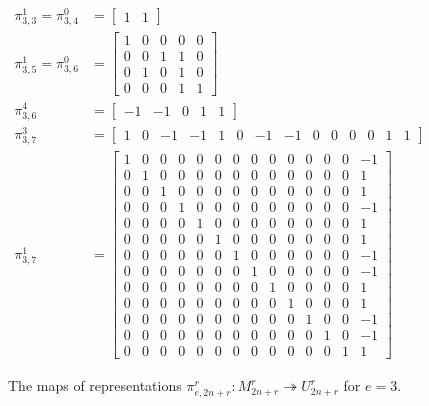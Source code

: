 \documentclass{amsart}
\begin{document}
\begin{figure}
\begin{align*} 
  \pi_{3,3}^1 = \pi_{3,4}^0 &=  
\begin{bmatrix}
  1 & 1
\end{bmatrix}\\
\pi_{3,5}^1 = \pi_{3,6}^0&=  
\begin{bmatrix}
  1 & 0 & 0 & 0 & 0\\
  0 & 0 & 1 & 1 & 0\\
  0 & 1 & 0 & 1 & 0\\
  0 & 0 & 0 & 1 & 1
\end{bmatrix}\\
\pi_{3,6}^4&=  
\begin{bmatrix}
  -1 & -1 & 0 & 1 & 1
\end{bmatrix}\\
\pi_{3,7}^3&=  
\begin{bmatrix}
 1 & 0 &-1 &-1 & 1 & 0 & -1 & -1 & 0 & 0 & 0 & 0 & 1 & 1
\end{bmatrix}\\
\pi_{3,7}^1&=  
\begin{bmatrix}
 1 & 0 & 0 & 0 & 0 & 0 & 0 & 0 & 0 & 0 & 0 & 0 & 0 &-1\\
 0 & 1 & 0 & 0 & 0 & 0 & 0 & 0 & 0 & 0 & 0 & 0 & 0 & 1\\
 0 & 0 & 1 & 0 & 0 & 0 & 0 & 0 & 0 & 0 & 0 & 0 & 0 & 1\\
 0 & 0 & 0 & 1 & 0 & 0 & 0 & 0 & 0 & 0 & 0 & 0 & 0 &-1\\
 0 & 0 & 0 & 0 & 1 & 0 & 0 & 0 & 0 & 0 & 0 & 0 & 0 & 1\\
 0 & 0 & 0 & 0 & 0 & 1 & 0 & 0 & 0 & 0 & 0 & 0 & 0 & 1\\
 0 & 0 & 0 & 0 & 0 & 0 & 1 & 0 & 0 & 0 & 0 & 0 & 0 &-1\\
 0 & 0 & 0 & 0 & 0 & 0 & 0 & 1 & 0 & 0 & 0 & 0 & 0 &-1\\
 0 & 0 & 0 & 0 & 0 & 0 & 0 & 0 & 1 & 0 & 0 & 0 & 0 & 1\\
 0 & 0 & 0 & 0 & 0 & 0 & 0 & 0 & 0 & 1 & 0 & 0 & 0 & 1\\
 0 & 0 & 0 & 0 & 0 & 0 & 0 & 0 & 0 & 0 & 1 & 0 & 0 &-1\\
 0 & 0 & 0 & 0 & 0 & 0 & 0 & 0 & 0 & 0 & 0 & 1 & 0 &-1\\
 0 & 0 & 0 & 0 & 0 & 0 & 0 & 0 & 0 & 0 & 0 & 0 & 1 & 1
\end{bmatrix}
\end{align*}
\caption{The maps of representations $\pi_{e,2n+r}^r:M_{2n + r}^r \twoheadrightarrow U_{2n+r}^r$ for $e = 3$.}
\label{Composition series e=3}
\end{figure}
  
\end{document}
